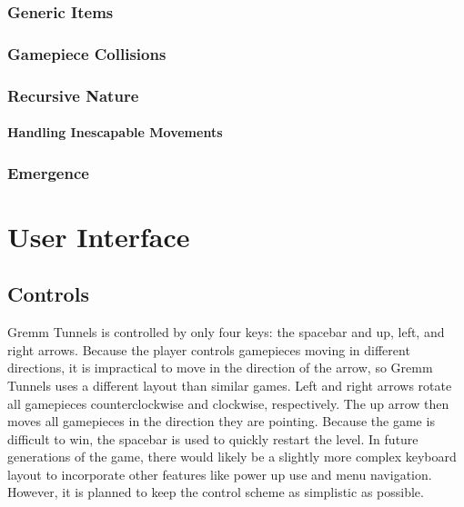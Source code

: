 \documentclass{scrreprt}
\begin{document}
			\subsection{Generic Items}
			
			\subsection{Gamepiece Collisions}
			
			\subsection{Recursive Nature}
			
				\subsubsection{Handling Inescapable Movements}
			
			\subsection{Emergence}
	
	\chapter{User Interface}
		
		\section{Controls}
			Gremm Tunnels is controlled by only four keys: the spacebar and up, left, and right arrows. Because the player controls gamepieces moving in different directions, it is impractical to move in the direction of the arrow, so Gremm Tunnels uses a different layout than similar games. Left and right arrows rotate all gamepieces counterclockwise and clockwise, respectively. The up arrow then moves all gamepieces in the direction they are pointing. Because the game is difficult to win, the spacebar is used to quickly restart the level. In future generations of the game, there would likely be a slightly more complex keyboard layout to incorporate other features like power up use and menu navigation. However, it is planned to keep the control scheme as simplistic as possible. 
		
\end{document}
